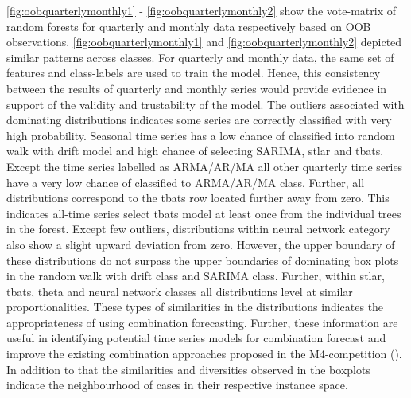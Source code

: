 \documentclass[11pt,a4paper,]{article}
\begin{document}
\autoref{fig:oobquarterlymonthly1} - \autoref{fig:oobquarterlymonthly2}
show the vote-matrix of random forests for quarterly and monthly data
respectively based on OOB observations.
\autoref{fig:oobquarterlymonthly1} and
\autoref{fig:oobquarterlymonthly2} depicted similar patterns across
classes. For quarterly and monthly data, the same set of features and
class-labels are used to train the model. Hence, this consistency
between the results of quarterly and monthly series would provide
evidence in support of the validity and trustability of the model. The
outliers associated with dominating distributions indicates some series
are correctly classified with very high probability. Seasonal time
series has a low chance of classified into random walk with drift model
and high chance of selecting SARIMA, stlar and tbats. Except the time
series labelled as ARMA/AR/MA all other quarterly time series have a
very low chance of classified to ARMA/AR/MA class. Further, all
distributions correspond to the tbats row located further away from
zero. This indicates all-time series select tbats model at least once
from the individual trees in the forest. Except few outliers,
distributions within neural network category also show a slight upward
deviation from zero. However, the upper boundary of these distributions
do not surpass the upper boundaries of dominating box plots in the
random walk with drift class and SARIMA class. Further, within stlar,
tbats, theta and neural network classes all distributions level at
similar proportionalities. These types of similarities in the
distributions indicates the appropriateness of using combination
forecasting. Further, these information are useful in identifying
potential time series models for combination forecast and improve the
existing combination approaches proposed in the M4-competition
(\textcite{Makridakis2018dx}). In addition to that the similarities and
diversities observed in the boxplots indicate the neighbourhood of cases
in their respective instance space.
\end{document}
